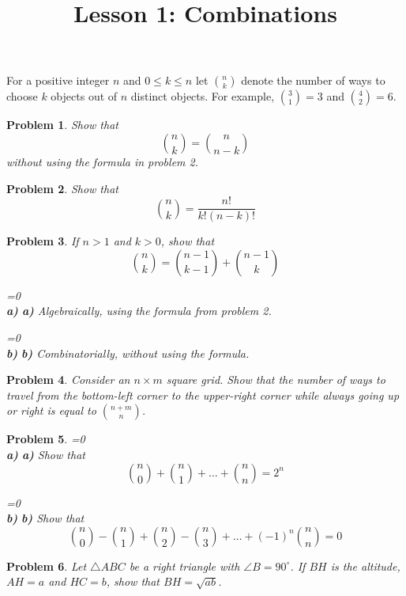 \documentclass[a4paper,12pt]{article}
\title{Lesson 1: Combinations}
\theoremstyle{perfect}
\newtheorem{prb}{Problem}
\newcommand{\varline}{0}
\renewcommand\part[1]{
\ifnum\pdfstrcmp{\varline}{1}=0
    \vspace{.10in}\textbf{\\#1)}
  \else
    \textbf{#1)}
  \fi\renewcommand{\varline}{1}}
\begin{document}
 
\maketitle

\noindent For a positive integer $n$ and $0 \leq k \leq n$ let $n \choose k$ denote the number of ways to choose $k$ objects out of $n$ distinct objects. For example, ${3 \choose 1} = 3$ and ${4 \choose 2} = 6$.
 
\begin{prb}
Show that $${n \choose k} = {n \choose n - k}$$ without using the formula in problem 2.
\end{prb}

\begin{prb}
Show that $${n \choose k} = \frac{n!}{k!(n-k)!}$$
\end{prb}

\begin{prb}
If $n > 1$ and $k > 0$, show that $${n \choose k} = {n-1 \choose k-1} + {n-1 \choose k}$$
\part{a} Algebraically, using the formula from problem 2. 
\part{b} Combinatorially, without using the formula.
\end{prb}

\begin{prb}
Consider an $n \times m$ square grid. Show that the number of ways to travel from the bottom-left corner to the upper-right corner while always going up or right is equal to ${{n+m} \choose n}$.
\end{prb}

\begin{prb}
\part{a} Show that $${n \choose 0} + {n \choose 1} + \ldots + {n \choose n} = 2^n$$
\part{b} Show that $${n \choose 0} - {n \choose 1} +  {n \choose 2} - {n \choose 3} + \ldots + (-1)^n{n \choose n} = 0$$
\end{prb}

\begin{prb}
Let $\triangle ABC$ be a right triangle with $\angle B = 90^\circ$. If $BH$ is the altitude, $AH = a$ and $HC = b$, show that $BH = \sqrt{ab}$.
\end{prb}
\end{document}
